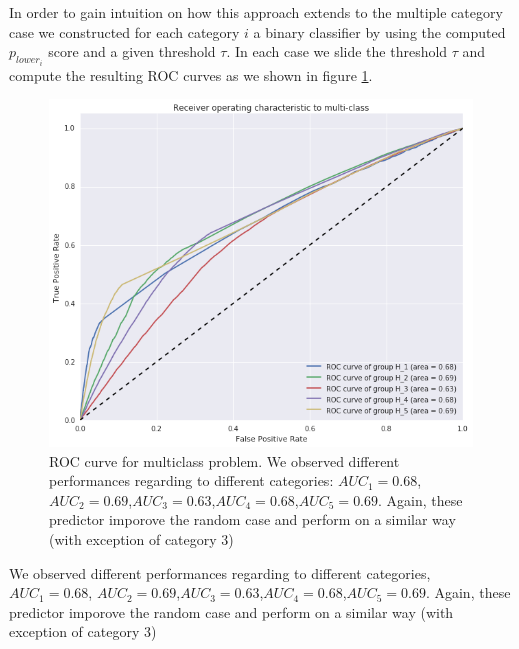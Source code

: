 In order to gain intuition on how this approach extends to the multiple category case we constructed for each category $i$ a binary classifier by using the computed $p_{lower_{i}}$ score and a given threshold $\tau$. In each case we slide the threshold $\tau$ and compute the resulting ROC curves as we shown in figure \ref{roc_multiple_categories}.

\begin{figure}
\includegraphics[width=\columnwidth]{figures/ROC_multiclass/ROC_multiclass.png}
\caption{ROC curve for multiclass problem. We observed different performances regarding to different categories: $AUC_1=0.68$, $AUC_2=0.69$,$AUC_3=0.63$,$AUC_4=0.68$,$AUC_5=0.69$. Again, these predictor imporove the random case and perform on a similar way (with exception of category 3)}
\label{roc_multiple_categories}
\end{figure}

We observed different performances regarding to different categories, $AUC_1=0.68$, $AUC_2=0.69$,$AUC_3=0.63$,$AUC_4=0.68$,$AUC_5=0.69$. Again, these predictor imporove the random case and perform on a similar way (with exception of category 3)


